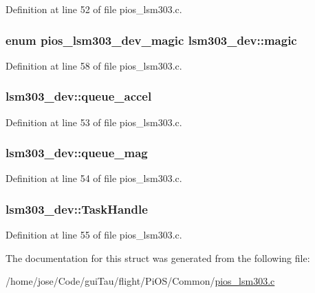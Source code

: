 Definition at line 52 of file pios\-\_\-lsm303.\-c.

\hypertarget{structlsm303__dev_a70f59374a7f9e9a6297167795f5b8bdf}{
\subsubsection[{magic}]{\setlength{\rightskip}{0pt plus 5cm}enum {\bf pios\-\_\-lsm303\-\_\-dev\-\_\-magic} lsm303\-\_\-dev\-::magic}}\label{structlsm303__dev_a70f59374a7f9e9a6297167795f5b8bdf}


Definition at line 58 of file pios\-\_\-lsm303.\-c.

\hypertarget{structlsm303__dev_aadc09417d06ef07b4f4eb39b74f947a0}{
\subsubsection[{queue\-\_\-accel}]{ lsm303\-\_\-dev\-::queue\-\_\-accel}}\label{structlsm303__dev_aadc09417d06ef07b4f4eb39b74f947a0}


Definition at line 53 of file pios\-\_\-lsm303.\-c.

\hypertarget{structlsm303__dev_a4801df95b04cdb58185c818dca8ae4ef}{
\subsubsection[{queue\-\_\-mag}]{ lsm303\-\_\-dev\-::queue\-\_\-mag}}\label{structlsm303__dev_a4801df95b04cdb58185c818dca8ae4ef}


Definition at line 54 of file pios\-\_\-lsm303.\-c.

\hypertarget{structlsm303__dev_aa53f45353583c54556c8fd920144726a}{
\subsubsection[{Task\-Handle}]{ lsm303\-\_\-dev\-::\-Task\-Handle}}\label{structlsm303__dev_aa53f45353583c54556c8fd920144726a}


Definition at line 55 of file pios\-\_\-lsm303.\-c.



The documentation for this struct was generated from the following file\-:\begin{DoxyCompactItemize}
\item 
/home/jose/\-Code/gui\-Tau/flight/\-Pi\-O\-S/\-Common/\hyperlink{pios__lsm303_8c}{pios\-\_\-lsm303.\-c}\end{DoxyCompactItemize}
